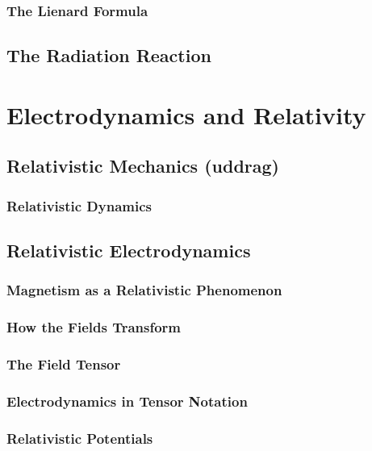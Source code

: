 \documentclass[11pt,a4paper]{article}
\begin{document}
\subsubsection{The Lienard Formula}
\subsection{The Radiation Reaction}
\section{Electrodynamics and Relativity}
\subsection{Relativistic Mechanics (uddrag)}
\subsubsection{Relativistic Dynamics}
\subsection{Relativistic Electrodynamics}
\subsubsection{Magnetism as a Relativistic Phenomenon}
\subsubsection{How the Fields Transform}
\subsubsection{The Field Tensor}
\subsubsection{Electrodynamics in Tensor Notation}
\subsubsection{Relativistic Potentials}
\end{document}
